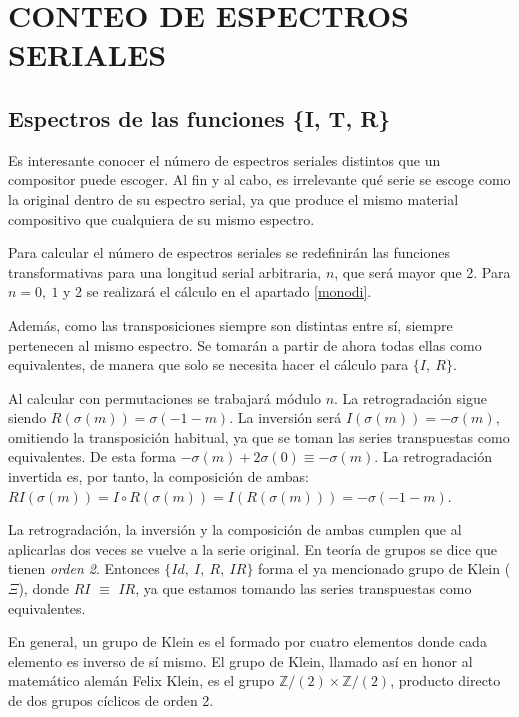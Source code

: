 \section{CONTEO DE ESPECTROS SERIALES}\label{ch:espectros}
	\subsection{Espectros de las funciones \{I, T, R\}}
		\label{espec}
		Es interesante conocer el n\'umero de espectros seriales distintos que un compositor puede escoger. Al fin y al cabo, es irrelevante qu\'e serie se escoge como la original dentro de su espectro serial, ya que produce el mismo material compositivo que cualquiera de su mismo espectro.
		
		Para calcular el n\'umero de espectros seriales se redefinir\'an las funciones transformativas para una longitud serial arbitraria, $n$, que ser\'a mayor que 2. Para $n=0,\ 1$ y 2 se realizar\'a el c\'alculo en el apartado \ref{monodi}. 
	
		Adem\'as, como las transposiciones siempre son distintas entre s\'i, siempre pertenecen al mismo espectro. Se tomar\'an a partir de ahora todas ellas como equivalentes, de manera que solo se necesita hacer el c\'alculo para $\{I,\ R\}$.
		
		Al calcular con permutaciones se trabajar\'a m\'odulo $n$. La retrogradaci\'on sigue siendo $R(\sigma(m))=\sigma(-1-m)$. La inversi\'on ser\'a $I(\sigma(m))=-\sigma(m)$, omitiendo la transposici\'on habitual, ya que se toman las series transpuestas como equivalentes. De esta forma $-\sigma(m)+2\sigma(0)\equiv-\sigma(m)$. La retrogradaci\'on invertida es, por tanto, la composici\'on de ambas: $RI(\sigma(m))={I}\circ{R}(\sigma(m))={I}\left({R}(\sigma(m))\right)=-\sigma(-1-m)$.			
		
		La retrogradaci\'on, la inversi\'on y la composici\'on de ambas cumplen que al aplicarlas dos veces se vuelve a la serie original. En teor\'ia de grupos se dice que tienen \textit{orden 2}. Entonces $\{Id,\ I,\ R,\ IR\}$ forma el ya mencionado grupo de Klein ($\Xi$), donde $RI$ $\equiv$ $IR$, ya que estamos tomando las series transpuestas como equivalentes. 
		
		En general, un grupo de Klein es el formado por cuatro elementos donde cada elemento es inverso de s\'i mismo. El grupo de Klein, llamado as\'i en honor al matem\'atico alem\'an Felix Klein, es el grupo $\mathbb{Z}/(2)\times\mathbb{Z}/(2)$, producto directo de dos grupos c\'iclicos de orden 2.
		
